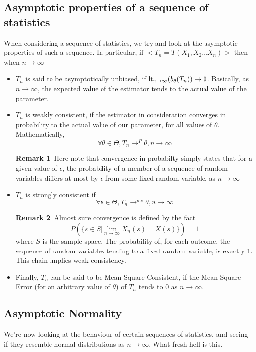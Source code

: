 \documentclass[12pt]{book}
\theoremstyle{definition}
\newtheorem*{remark}{Remark}
\begin{document}
\subsection{Asymptotic properties of a sequence of statistics}
When considering a sequence of statistics, we try and look at the asymptotic properties of such a sequence. In particular, if $<T_n = T(X_1,X_2\ldots X_n)>$ then when $n \to \infty$ \begin{itemize}
    \item $T_n$ is said to be asymptotically unbiased, if $\textnormal{lt}_{n \to \infty} (b_{\theta}(T_n)) \to 0$. Basically, as $n \to \infty$, the expected value of the estimator tends to the actual value of the parameter.
    \item $T_n$ is weakly consistent, if the estimator in consideration converges in probability to the actual value of our parameter, for all values of $\theta$. Mathematically, $$\forall \theta \in \Theta, T_n \to^P \theta, n \to \infty$$ \begin{remark}
        Here note that convergence in probabilty simply states that for a given value of $\epsilon$, the probability of a member of a sequence of random variables differs at most by $\epsilon$ from some fixed random variable, as $n \to \infty$
    \end{remark}
    \item $T_n$ is strongly consistent if $$\forall \theta \in \Theta, T_n \to^{a.s} \theta, n \to \infty$$ \begin{remark}
        Almost sure convergence is defined by the fact $$P(\{s \in S | \lim_{n \to \infty} X_n(s) = X(s)\}) = 1$$ where $S$ is the sample space. The probability of, for each outcome, the sequence of random variables tending to a fixed random variable, is exactly 1. This chain implies weak consistency.  
    \end{remark}
    \item Finally, $T_n$ can be said to be Mean Square Consistent, if the Mean Square Error (for an arbitrary value of $\theta$) of $T_n$ tends to 0 as $n \to \infty$.
\end{itemize}
\subsection{Asymptotic Normality}
We're now looking at the behaviour of certain sequences of statistics, and seeing if they resemble normal distributions as $n \to \infty$. What fresh hell is this.
\end{document}
